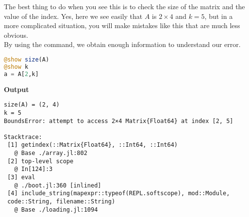 The best thing to do when you see this is to check the size of the matrix and the value of the index. Yes, here we see easily that $A$ is $2 \times 4$ and $k=5$, but in a more complicated situation, you will make mistakes like this that are much less obvious. \\

By using the \texttt{\@show} command, we obtain enough information to understand our error.

\begin{lstlisting}[language=Julia,style=mystyle]
@show size(A)
@show k
a = A[2,k]
\end{lstlisting}
\textbf{Output} 
\begin{verbatim}
size(A) = (2, 4)
k = 5
BoundsError: attempt to access 2×4 Matrix{Float64} at index [2, 5]

Stacktrace:
 [1] getindex(::Matrix{Float64}, ::Int64, ::Int64)
   @ Base ./array.jl:802
 [2] top-level scope
   @ In[124]:3
 [3] eval
   @ ./boot.jl:360 [inlined]
 [4] include_string(mapexpr::typeof(REPL.softscope), mod::Module, 
 code::String, filename::String)
   @ Base ./loading.jl:1094
\end{verbatim}























